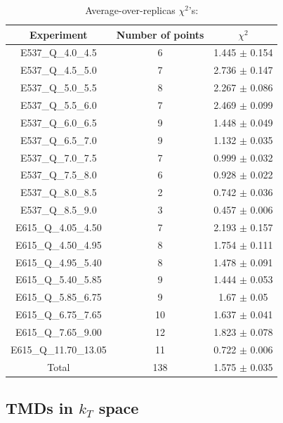 \documentclass[]{article}
\begin{document}
\begin{table}[h]

\centering

\begin{tabular}{|c|c|c|} \hline

\textbf{Experiment} & \textbf{Number of
points} & \textbf{\(\chi^2\)} \\ \hline

E537\_Q\_4.0\_4.5 & 6 & 1.445 \(\pm\) 0.154 \\ \hline
E537\_Q\_4.5\_5.0 & 7 & 2.736 \(\pm\) 0.147 \\ \hline
E537\_Q\_5.0\_5.5 & 8 & 2.267 \(\pm\) 0.086 \\ \hline
E537\_Q\_5.5\_6.0 & 7 & 2.469 \(\pm\) 0.099 \\ \hline
E537\_Q\_6.0\_6.5 & 9 & 1.448 \(\pm\) 0.049 \\ \hline
E537\_Q\_6.5\_7.0 & 9 & 1.132 \(\pm\) 0.035 \\ \hline
E537\_Q\_7.0\_7.5 & 7 & 0.999 \(\pm\) 0.032 \\ \hline
E537\_Q\_7.5\_8.0 & 6 & 0.928 \(\pm\) 0.022 \\ \hline
E537\_Q\_8.0\_8.5 & 2 & 0.742 \(\pm\) 0.036 \\ \hline
E537\_Q\_8.5\_9.0 & 3 & 0.457 \(\pm\) 0.006 \\ \hline
E615\_Q\_4.05\_4.50 & 7 & 2.193 \(\pm\) 0.157 \\ \hline
E615\_Q\_4.50\_4.95 & 8 & 1.754 \(\pm\) 0.111 \\ \hline
E615\_Q\_4.95\_5.40 & 8 & 1.478 \(\pm\) 0.091 \\ \hline
E615\_Q\_5.40\_5.85 & 9 & 1.444 \(\pm\) 0.053 \\ \hline
E615\_Q\_5.85\_6.75 & 9 & 1.67 \(\pm\) 0.05 \\ \hline
E615\_Q\_6.75\_7.65 & 10 & 1.637 \(\pm\) 0.041 \\ \hline
E615\_Q\_7.65\_9.00 & 12 & 1.823 \(\pm\) 0.078 \\ \hline
E615\_Q\_11.70\_13.05 & 11 & 0.722 \(\pm\) 0.006 \\ \hline
Total & 138 & 1.575 \(\pm\) 0.035 \\ \hline

\end{tabular}

\caption{Average-over-replicas \(\chi^2\)'s:}

\end{table}

\hypertarget{tmds-in-k_t-space}{%
\subsection{\texorpdfstring{TMDs in \(k_T\)
space}{TMDs in k\_T space}}\label{tmds-in-k_t-space}}
\end{document}
